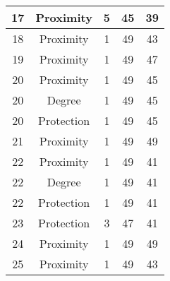 \documentclass[results.tex]{subfiles}
\begin{document}
\begin{center}
\begin{tabular}{| c || c | c | c | c |}
            \hline
            17                      & Proximity                    & 5                      & 45                      & 39                   \\
            \hline
            18                      & Proximity                    & 1                      & 49                      & 43                   \\
            \hline
            19                      & Proximity                    & 1                      & 49                      & 47                   \\
            \hline
            20                      & Proximity                    & 1                      & 49                      & 45                   \\
            \hline
            20                      & Degree                       & 1                      & 49                      & 45                   \\
            \hline
            20                      & Protection                   & 1                      & 49                      & 45                   \\
            \hline
            21                      & Proximity                    & 1                      & 49                      & 49                   \\
            \hline
            22                      & Proximity                    & 1                      & 49                      & 41                   \\
            \hline
            22                      & Degree                       & 1                      & 49                      & 41                   \\
            \hline
            22                      & Protection                   & 1                      & 49                      & 41                   \\
            \hline
            23                      & Protection                   & 3                      & 47                      & 41                   \\
            \hline
            24                      & Proximity                    & 1                      & 49                      & 49                   \\
            \hline
            25                      & Proximity                    & 1                      & 49                      & 43                   \\

\end{tabular}
\end{center}
\end{document}
